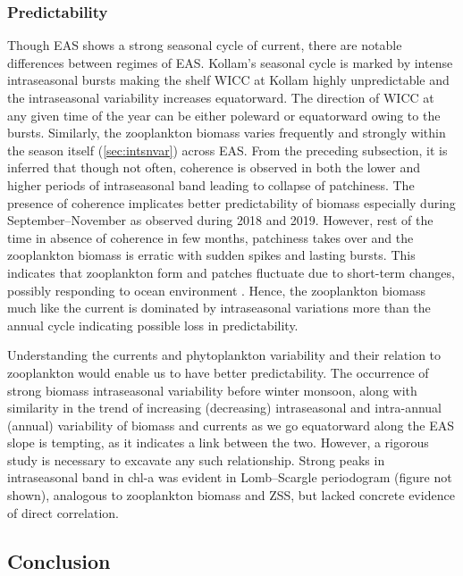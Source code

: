 \documentclass{article}
\begin{document}
 	\subsubsection{Predictability}
    Though EAS shows a strong seasonal cycle of current, there are notable differences between regimes of EAS. Kollam's seasonal cycle is marked by intense intraseasonal bursts making the shelf WICC at Kollam highly unpredictable \citep{chaudhuri2021observed} and the intraseasonal variability increases equatorward. The direction of WICC at any given time of the year can be either poleward or equatorward owing to the bursts. Similarly, the zooplankton biomass varies frequently and strongly within the season itself (\autoref{sec:intsnvar}) across EAS. From the preceding subsection, it is inferred that though not often, coherence is observed in both the lower and higher periods of intraseasonal band leading to collapse of patchiness. The presence of coherence implicates better predictability of biomass especially during September--November as observed during 2018 and 2019. However, rest of the time in absence of coherence in few months, patchiness takes over and the zooplankton biomass is erratic with sudden spikes and lasting bursts. This indicates that zooplankton form and patches fluctuate due to short-term changes, possibly responding to ocean environment \citep{folt1999biological,raghukumar2003marine,anil2021short}. Hence, the zooplankton biomass much like the current is dominated by intraseasonal variations more than the annual cycle indicating possible loss in predictability. 
         
	Understanding the currents and phytoplankton variability and their relation to zooplankton would enable us to have better predictability. The occurrence of strong biomass intraseasonal variability before winter monsoon, along with similarity in the trend of increasing (decreasing) intraseasonal and intra-annual (annual) variability  of biomass and currents as we go equatorward along the EAS slope is tempting, as it indicates a link between the two. However, a rigorous study is necessary to excavate any such relationship. Strong peaks in intraseasonal band in chl-a was evident in Lomb--Scargle periodogram (figure not shown), analogous to zooplankton biomass and ZSS, but lacked concrete evidence of direct correlation. 
 	  
	\subsection{Conclusion}
\end{document}
